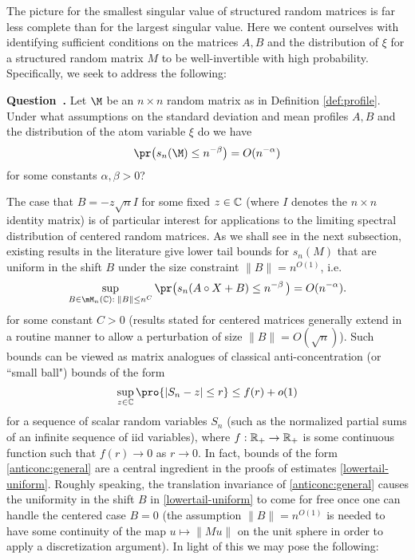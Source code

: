 \documentclass[aop,preprint]{imsart}
\theoremstyle{plain}
\theoremstyle{definition}
\theoremstyle{remark}
\newcounter{question}[section]
\newenvironment{question}[1][]{\refstepcounter{question}\par\medskip
   \noindent\textbf{Question~\thequestion. #1} \rmfamily}{\medskip}
\renewcommand*{\thequestion}{\Alph{question}}
\numberwithin{equation}{section}
\numberwithin{theorem}{section}
\begin{document}
The picture for the smallest singular value of structured random matrices is far less complete than for the largest singular value. %
Here we content ourselves with identifying sufficient conditions on the matrices $A,B$ and the distribution of $\xi$ for a structured random matrix $M$ to be well-invertible with high probability. Specifically, we seek to address the following:

\begin{question}		\label{prob:main}
Let $\M$ be an $n\times n$ random matrix as in Definition \ref{def:profile}.
Under what assumptions on the standard deviation and mean profiles $A,B$ 
and the distribution of the atom variable $\xi$ 
do we have
\begin{equation}	\label{lowertail}
\pr\big( s_n(\M) \le n^{-\beta}\big) = O(n^{-\alpha})
\end{equation}
for some constants $\alpha,\beta>0$?
\end{question}

The case that $B=-z\sqrt{n} I $ for some fixed $z\in {\mathbb C}$ (where $I$ denotes the $n\times n$ identity matrix) is of particular interest for applications to the limiting spectral distribution of centered random matrices. %
As we shall see in the next subsection, existing results in the literature give lower tail bounds for $s_n(M)$ that are uniform in the shift $B$ under the size constraint $\|B\|=n^{O(1)}$, i.e. 
\begin{equation}	\label{lowertail-uniform}
\sup_{B\in \mM_n(\C): \;\|B\| \le  n^{C}} \pr\big( s_n(A\circ X + B) \le n^{-\beta}\,\big) = O(n^{-\alpha}).
\end{equation}
for some constant $C>0$ (results stated for centered matrices generally extend in a routine manner to allow a perturbation of size $\|B\|=O(\sqrt{n})$).
Such bounds can be viewed as matrix analogues of classical anti-concentration (or ``small ball") bounds of the form
\begin{equation}	\label{anticonc:general}
\sup_{z\in \C} \pro{ |S_n - z|\le r} \le f(r) + o(1)
\end{equation}
for a sequence of scalar random variables $S_n$ (such as the normalized partial sums of an infinite sequence of iid variables), where $f:{\mathbb R}_+\to {\mathbb R}_+$ is some continuous function such that $f(r)\to 0$ as $r\to 0$.
In fact, bounds of the form \eqref{anticonc:general} are a central ingredient in the proofs of estimates \eqref{lowertail-uniform}. 
Roughly speaking, the translation invariance of \eqref{anticonc:general} causes the uniformity in the shift $B$ in \eqref{lowertail-uniform} to come for free once one can handle the centered case $B=0$ (the assumption $\|B\|=n^{O(1)}$ is needed to have some continuity of the map $u\mapsto \|Mu\|$ on the unit sphere in order to apply a discretization argument). 
In light of this we may pose the following:
\end{document}
